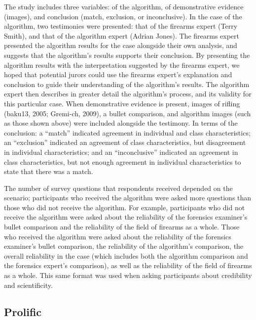 \documentclass[print]{nuthesis}
\begin{document}
The study includes three  variables:  of the algorithm,  of demonstrative evidence (images), and conclusion (match, exclusion, or inconclusive).
In the case of the algorithm, two testimonies were presented: that of the firearms expert (Terry Smith), and that of the algorithm expert (Adrian Jones).
The firearms expert presented the algorithm results for the case alongside their own analysis, and suggests that the algorithm's results supports their conclusion.
By presenting the algorithm results with the interpretation suggested by the firearms expert, we hoped that potential jurors could use the firearms expert's explanation and conclusion to guide their understanding of the algorithm's results.
The algorithm expert then describes in greater detail the algorithm's process, and its validity for this particular case.
When demonstrative evidence is present, images of rifling (baku13, 2005; Gremi-ch, 2009), a bullet comparison, and algorithm images (such as those shown above) were included alongside the testimony.
In terms of the conclusion: a ``match'' indicated agreement in individual and class characteristics; an ``exclusion'' indicated an agreement of class characteristics, but disagreement in individual characteristics; and an ``inconclusive'' indicated an agreement in class characteristics, but not enough agreement in individual characteristics to state that there was a match.

The number of survey questions that respondents received depended on the scenario; participants who received the algorithm were asked more questions than those who did not receive the algorithm.
For example, participants who did not receive the algorithm were asked about the reliability of the forensics examiner's bullet comparison and the reliability of the field of firearms as a whole.
Those who received the algorithm were asked about the reliability of the forensics examiner's bullet comparison, the reliability of the algorithm's comparison, the overall reliability in the case (which includes both the algorithm comparison and the forensics expert's comparison), as well as the reliability of the field of firearms as a whole.
This same format was used when asking participants about credibility and scientificity.

\hypertarget{prolific}{%
\subsection{Prolific}\label{prolific}}
\end{document}
